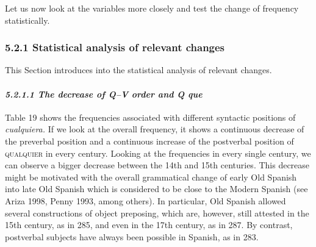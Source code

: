 \begin{styleStandard}
Let us now look at the variables more closely and test the change of frequency statistically.
\end{styleStandard}

\subsubsection[5.2.1 Statistical analysis of relevant changes]{\textbf{5.2.1 Statistical analysis of relevant changes}}
\begin{styleStandard}
This Section introduces into the statistical analysis of relevant changes.
\end{styleStandard}

\paragraph[5.2.1.1 The decrease of Q–V order and Q que]{\textit{5.2.1.1 The decrease of Q–V order and Q que}}
\begin{styleStandard}
Table 19 shows the frequencies associated with different syntactic positions of \textit{cualquiera.} If we look at the overall frequency, it shows a continuous decrease of the preverbal position and a continuous increase of the postverbal position of\textit{ }\textsc{qualquier} in every century. Looking at the frequencies in every single century, we can observe a bigger decrease between the 14th and 15th centuries. This decrease might be motivated with the overall grammatical change of early Old Spanish into late Old Spanish which is considered to be close to the Modern Spanish (see Ariza 1998, Penny 1993, among others). In particular, Old Spanish allowed several constructions of object preposing, which are, however, still attested in the 15th century, as in 285, and even in the 17th century, as in 287. By contrast, postverbal subjects have always been possible in Spanish, as in 283.
\end{styleStandard}

